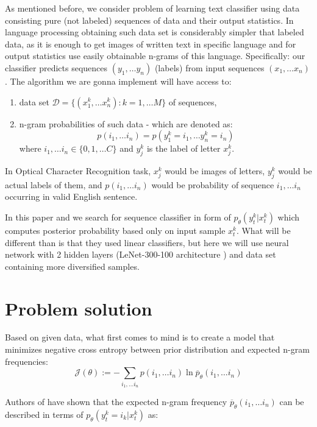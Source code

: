 \documentclass[shortabstract,lic,english]{iithesis}
\begin{document}
As mentioned before, we consider problem of learning text classifier using data consisting pure (not labeled) sequences of data and their output statistics. In language processing obtaining such data set is considerably simpler that labeled data, as it is enough to get images of written text in specific language and for output statistics use easily obtainable n-grams of this language. Specifically: our classifier predicts sequences \( (y_1, \dots y_n) \) (labels) from input sequences \( (x_1, \dots x_n) \). The  algorithm we are gonna implement will have access to:
\begin{enumerate}
    \item  data set \( \mathcal{D} = \lbrace (x_1^k, \dots x_n^k) : k = 1, \dots M \rbrace \) of sequences,
    \item n-gram probabilities of such data - which are denoted as: 
\[ p(i_1, \dots i_n) = p(y_1^k = i_1, \dots y_n^k = i_n) \]
where \( i_1, \dots i_n \in \lbrace 0, 1, \dots C \rbrace \) and \( y_j^k \) is the label of letter \( x_j^k \).
\end{enumerate}

In Optical Character Recognition task, $x_j^k$ would be images of letters, $y_j^k$ would be actual labels of them, and $p(i_1, \dots i_n)$ would be probability of sequence $i_1, \dots i_n$ occurring in valid English sentence.

In this paper and \citep{liu2017unsupervised} we search for sequence classifier in form of $p_\theta(y_t^k | x_t^k)$ which computes posterior probability based only on input sample $x_t^k$. What will be different than \citep{liu2017unsupervised} is that they used linear classifiers, but here we will use neural network with 2 hidden layers (\mbox{LeNet-300-100} architecture \citep{lecun1998gradient}) and data set containing more diversified samples.

\chapter{Problem solution}


Based on given data, what first comes to mind is to create a model that minimizes negative cross entropy between prior distribution and expected n-gram frequencies:
\begin{equation} \label{cross-entropy}
    \mathcal{J}(\theta) := - \sum_{i_1, \dots i_n}p(i_1,\dots i_n) \ln \overline{p}_\theta(i_1, \dots i_n)
\end{equation}

Authors of \citep{liu2017unsupervised} have shown that the expected n-gram frequency $\overline{p}_\theta(i_1, \dots i_n)$ can be described in terms of $p_\theta(y_t^k = i_k | x_t^k)$ as:
\end{document}
